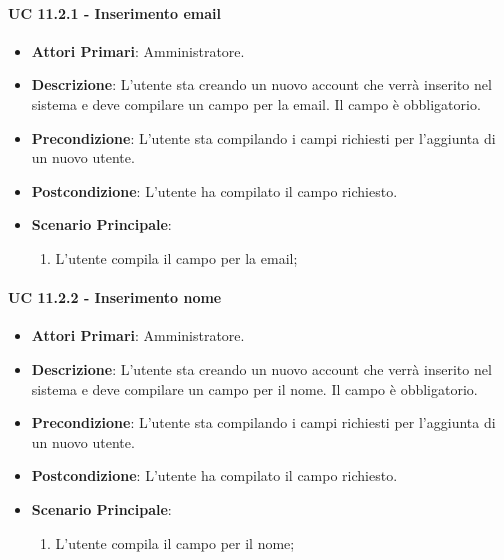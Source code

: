 			\paragraph{UC 11.2.1 - Inserimento email}
			\begin{itemize}
				\item \textbf{Attori Primari}: Amministratore.
				\item \textbf{Descrizione}: L'utente sta creando un nuovo account che verrà inserito nel sistema e deve compilare un campo per la email. Il campo è obbligatorio.
				\item \textbf{Precondizione}: L'utente sta compilando i campi richiesti per l'aggiunta di un nuovo utente.
				\item \textbf{Postcondizione}: L'utente ha compilato il campo richiesto.
				\item \textbf{Scenario Principale}:
				\begin{enumerate}
					\item{L'utente compila il campo per la email;}
				\end{enumerate}	
			\end{itemize}

			\paragraph{UC 11.2.2 - Inserimento nome}
			\begin{itemize}
				\item \textbf{Attori Primari}: Amministratore.
				\item \textbf{Descrizione}: L'utente sta creando un nuovo account che verrà inserito nel sistema e deve compilare un campo per il nome. Il campo è obbligatorio.
				\item \textbf{Precondizione}: L'utente sta compilando i campi richiesti per l'aggiunta di un nuovo utente.
				\item \textbf{Postcondizione}: L'utente ha compilato il campo richiesto.
				\item \textbf{Scenario Principale}:
				\begin{enumerate}
					\item{L'utente compila il campo per il nome;}
				\end{enumerate}	
			\end{itemize}

